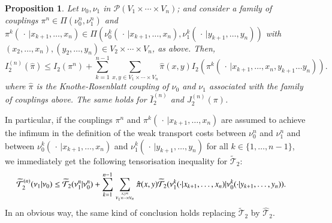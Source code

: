 \documentclass[11pt]{amsart}
\newtheorem{prop}[equation]{Proposition}
\numberwithin{equation}{section}
\begin{document}
\begin{prop}\label{prop:tensor}
Let $\nu_0, \nu_1$ in $\mathcal{P}(V_1 \times \cdots\times V_n)$; and consider a family of couplings $\pi^n \in \Pi(\nu_{0}^n,\nu_{1}^n)$ and $\pi^k(\,\cdot\,| x_{k+1},\ldots,x_{n}) \in \Pi(\nu_{0}^k(\,\cdot\,| x_{k+1},\ldots,x_{n}) , \nu_{1}^k(\,\cdot\,| y_{k+1},\ldots,y_{n}))$ with $(x_{2},\ldots,x_{n}),(y_{2},\ldots,y_{n}) \in V_{2}\times\cdots\times V_{n}$, as above.
Then,
$$
I_2^{(n)}(\hat \pi) \leq I_2(\pi^n ) 
+ \sum_{k=1}^{n-1}\sum_{x,y \in V_1\times \cdots\times V_{n}} {\hat \pi}(x,y)   I_2(\pi^k(\,\cdot\,|x_{k+1},\ldots,x_{n},y_{k+1}\ldots y_{n})).
$$
where $\hat \pi$ is the Knothe-Rosenblatt coupling of $\nu_0$ and $\nu_1$ associated with the family of couplings above. The same holds for $\bar{I}_{2}^{(n)}$ and $ J_2^{(n)}(\pi)$.
\end{prop}
In particular, if the couplings $\pi^n$ and $\pi^k(\,\cdot\,| x_{k+1},\ldots,x_{n})$ are assumed to achieve the infimum in the definition of the weak transport costs between $\nu_{0}^n$ and $\nu_{1}^n$ and between $\nu_{0}^k(\,\cdot\,| x_{k+1},\ldots,x_{n})$ and $\nu_{1}^k(\,\cdot\,| y_{k+1},\ldots,y_{n})$ for all $k\in\{1,\ldots,n-1\}$, we immediately get the following tensorisation inequality for ${\widetilde{\mathcal{T}}}_{2}$:
\begin{align}\label{eq:tensor}
{\widetilde{\mathcal{T}}}_{2}^{(n)}(\nu_{1}|\nu_{0}) & \leq {\widetilde{\mathcal{T}}}_{2}(\nu_{1}^n|\nu_{0}^n)
+ \sum_{k=1}^{n-1}\sum_{\genfrac{}{}{0pt}{}{x,y \in }{V_1\times \cdots\times V_{n}}} {\hat \pi}(x,y)   {\widetilde{\mathcal{T}}}_{2}(\nu_{1}^k(\cdot| x_{k+1},\ldots,x_{n}) | \nu_{0}^k(\cdot| y_{k+1},\ldots,y_{n})).
\end{align}
In an obvious way, the same kind of conclusion holds replacing ${\widetilde{\mathcal{T}}}_{2}$ by $\hat {\mathcal{T}}_{2}$.
\end{document}
